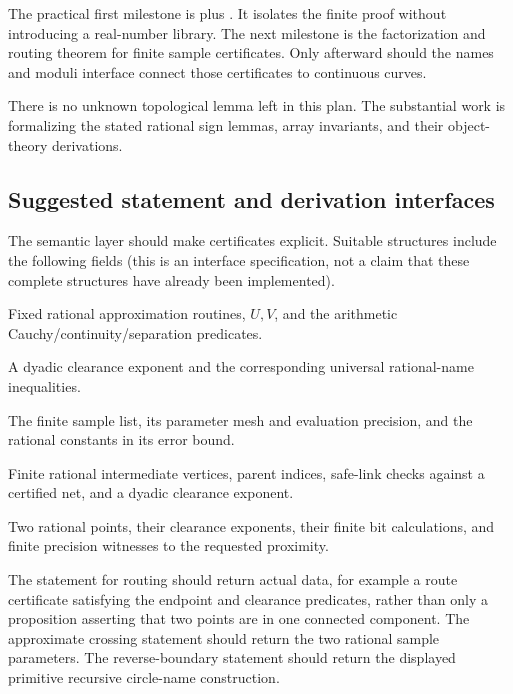 The practical first milestone is  plus
. It isolates the finite proof without
introducing a real-number library. The next milestone is
the factorization and routing theorem for finite sample
certificates. Only afterward should the names and moduli
interface connect those certificates to continuous curves.

There is no unknown topological lemma left in this plan.
The substantial work is formalizing the stated rational sign
lemmas, array invariants, and their object-theory derivations.

\subsection{Suggested statement and derivation interfaces}

The semantic layer should make certificates explicit. Suitable
structures include the following fields (this is an interface
specification, not a claim that these complete structures have
already been implemented).

\begin{description}[leftmargin=0pt,labelindent=0pt]
\item[\texttt{CurvePresentation}]
Fixed rational approximation routines, $U,V$, and the
arithmetic Cauchy/continuity/separation predicates.
\item[\texttt{OffCertificate}]
A dyadic clearance exponent and the corresponding
universal rational-name inequalities.
\item[\texttt{NetCertificate}]
The finite sample list, its parameter mesh and evaluation
precision, and the rational constants in its error bound.
\item[\texttt{RouteCertificate}]
Finite rational intermediate vertices, parent indices,
safe-link checks against a certified net, and a dyadic
clearance exponent.
\item[\texttt{BoundaryWitnesses}]
Two rational points, their clearance exponents, their
finite bit calculations, and finite precision witnesses
to the requested proximity.
\end{description}

The statement for routing should return actual data, for example
a route certificate satisfying the endpoint and clearance
predicates, rather than only a proposition asserting that two
points are in one connected component. The approximate crossing
statement should return the two rational sample parameters.
The reverse-boundary statement should return the displayed
primitive recursive circle-name construction.

